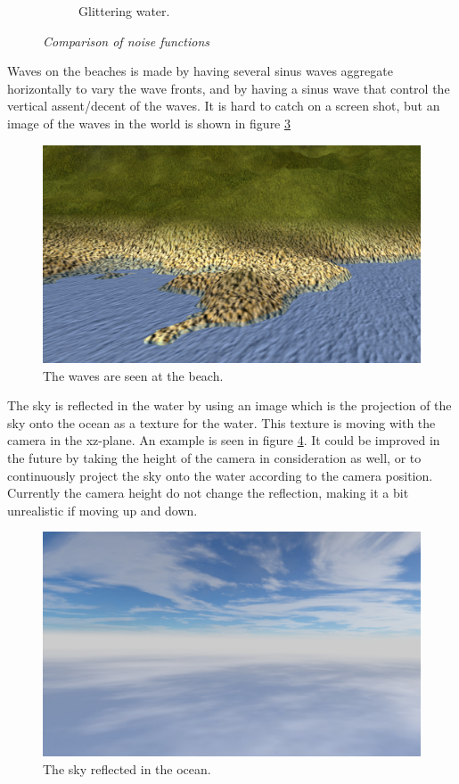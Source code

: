 \begin{figure}[H]
\begin{subfigure}{.5\textwidth}
  \caption{Glittering water.}
  \label{fig:waterGlistering}
\end{subfigure}
\caption[Noise comparison]{\textit{Comparison of noise functions}}
\label{fig:water}
\end{figure}
Waves on the beaches is made by having several sinus waves aggregate horizontally to vary the wave fronts, and by having a sinus wave that control the vertical assent/decent of the waves. It is hard to catch on a screen shot, but an image of the waves in the world is shown in figure \ref{fig:waves}
\begin{figure}[H]
  \centering
  \includegraphics[width=0.9\linewidth]{images/waves.jpg}
  \caption{The waves are seen at the beach.}
  \label{fig:waves}
\end{figure}%
The sky is reflected in the water by using an image which is the projection of the sky onto the ocean as a texture for the water. This texture is moving with the camera in the xz-plane. An example is seen in figure \ref{fig:skyReflection}. It could be improved in the future by taking the height of the camera in consideration as well, or to continuously project the sky onto the water according to the camera position. Currently the camera height do not change the reflection, making it a bit unrealistic if moving up and down.
\begin{figure}[H]
  \centering
  \includegraphics[width=0.9\linewidth]{images/reflectingSky.jpg}
  \caption{The sky reflected in the ocean.}
  \label{fig:skyReflection}
\end{figure}%

